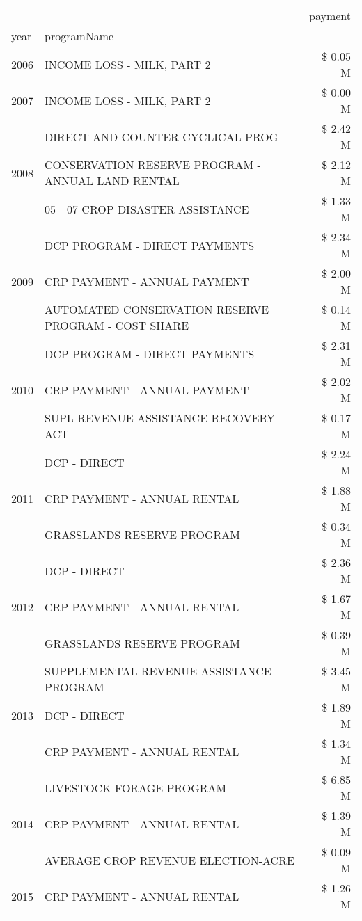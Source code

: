 \begin{tabular}{llr}
\toprule
 &  & payment \\
year & programName &  \\
\midrule
2006 & INCOME LOSS - MILK, PART 2 & \$ 0.05 M \\
\cline{1-3}
2007 & INCOME LOSS - MILK, PART 2 & \$ 0.00 M \\
\cline{1-3}
\multirow[t]{3}{*}{2008} & DIRECT AND COUNTER CYCLICAL PROG & \$ 2.42 M \\
 & CONSERVATION RESERVE PROGRAM - ANNUAL LAND RENTAL & \$ 2.12 M \\
 & 05 - 07 CROP DISASTER ASSISTANCE & \$ 1.33 M \\
\cline{1-3}
\multirow[t]{3}{*}{2009} & DCP PROGRAM - DIRECT PAYMENTS & \$ 2.34 M \\
 & CRP PAYMENT - ANNUAL PAYMENT & \$ 2.00 M \\
 & AUTOMATED CONSERVATION RESERVE PROGRAM - COST SHARE & \$ 0.14 M \\
\cline{1-3}
\multirow[t]{3}{*}{2010} & DCP PROGRAM - DIRECT PAYMENTS & \$ 2.31 M \\
 & CRP PAYMENT - ANNUAL PAYMENT & \$ 2.02 M \\
 & SUPL REVENUE ASSISTANCE RECOVERY ACT & \$ 0.17 M \\
\cline{1-3}
\multirow[t]{3}{*}{2011} & DCP - DIRECT & \$ 2.24 M \\
 & CRP PAYMENT - ANNUAL RENTAL & \$ 1.88 M \\
 & GRASSLANDS RESERVE PROGRAM & \$ 0.34 M \\
\cline{1-3}
\multirow[t]{3}{*}{2012} & DCP - DIRECT & \$ 2.36 M \\
 & CRP PAYMENT - ANNUAL RENTAL & \$ 1.67 M \\
 & GRASSLANDS RESERVE PROGRAM & \$ 0.39 M \\
\cline{1-3}
\multirow[t]{3}{*}{2013} & SUPPLEMENTAL REVENUE ASSISTANCE PROGRAM & \$ 3.45 M \\
 & DCP - DIRECT & \$ 1.89 M \\
 & CRP PAYMENT - ANNUAL RENTAL & \$ 1.34 M \\
\cline{1-3}
\multirow[t]{3}{*}{2014} & LIVESTOCK FORAGE PROGRAM & \$ 6.85 M \\
 & CRP PAYMENT - ANNUAL RENTAL & \$ 1.39 M \\
 & AVERAGE CROP REVENUE ELECTION-ACRE & \$ 0.09 M \\
\cline{1-3}
\multirow[t]{3}{*}{2015} & CRP PAYMENT - ANNUAL RENTAL & \$ 1.26 M \\

\end{tabular}
